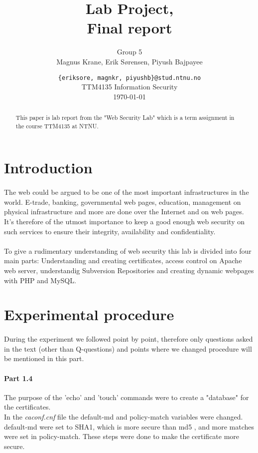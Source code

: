 \documentclass[a4paper,11pt]{article}
\title{Lab Project,\\Final report}
\author{Group 5 \\Magnus Krane, Erik S\o rensen, Piyush Bajpayee}
\date{ {\tt \{eriksore, magnkr, piyushb\}@stud.ntnu.no}\\
TTM4135 Information Security\\
\today}
\begin{document}
\maketitle
\vspace{3cm}
\begin{abstract}
This paper is lab report from the "Web Security Lab" which is a term assignment in the course TTM4135 at NTNU. 
\end{abstract}
\section{Introduction}
\paragraph{}The web could be argued to be one of the most important infrastructures in the world. E-trade, banking, governmental web pages, education, management on physical infrastructure and more are done over the Internet and on web pages.
It's therefore of the utmost importance to keep a good enough web security on such services to ensure their integrity, availability and confidentiality. 
\paragraph{}To give a rudimentary understanding of web security this lab is divided into four main parts: Understanding and creating certificates, access control on Apache web server, understandig Subversion Repositories and creating dynamic webpages with PHP and MySQL.
\section{Experimental procedure}
\paragraph{}During the experiment we followed \cite{1} point by point, therefore only questions asked in the text (other than Q-questions) and points where we changed procedure will be mentioned in this part.
\paragraph{Part 1.4}The purpose of the 'echo' and 'touch' commands were to create a "database" for the certificates.\\
In the \emph{caconf.cnf} file the default-md and policy-match variables were changed. default-md were set to SHA1, which is more secure than md5 \cite{3}, and more matches were set in policy-match. These steps were done to make the certificate more secure.
\end{document}
